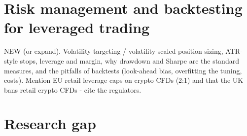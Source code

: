 \section{Risk management and backtesting for leveraged trading}\label{sec:bg-risk}
\begin{guide}
NEW (or expand). Volatility targeting / volatility-scaled position sizing, ATR-style stops, leverage and margin, why drawdown and Sharpe are the standard measures, and the pitfalls of backtests (look-ahead bias, overfitting the tuning, costs). Mention EU retail leverage caps on crypto CFDs (2:1) and that the UK bans retail crypto CFDs - cite the regulators.
\end{guide}
\tbc{}

\section{Research gap}
\tbc{}
